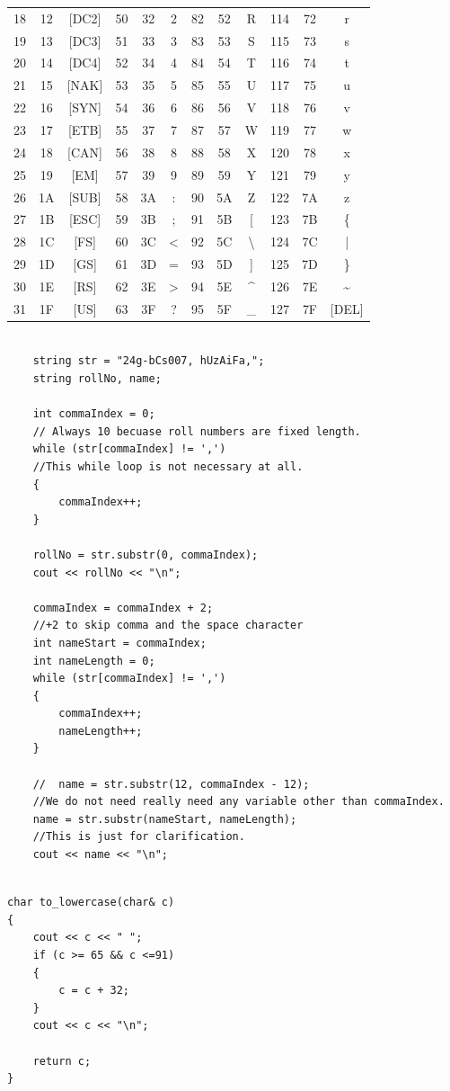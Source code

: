 \documentclass[12pt]{article}
\begin{document}
\begin{table}[H]
{\begin{tabular}{| c | c | c | c | c | c | c | c | c | c | c | c |}
    18 & 12 & [DC2] & 50 & 32 & 2 & 82 & 52 & R & 114 & 72 & r \\
    19 & 13 & [DC3] & 51 & 33 & 3 & 83 & 53 & S & 115 & 73 & s \\
    20 & 14 & [DC4] & 52 & 34 & 4 & 84 & 54 & T & 116 & 74 & t \\
    21 & 15 & [NAK] & 53 & 35 & 5 & 85 & 55 & U & 117 & 75 & u \\
    22 & 16 & [SYN] & 54 & 36 & 6 & 86 & 56 & V & 118 & 76 & v \\
    23 & 17 & [ETB] & 55 & 37 & 7 & 87 & 57 & W & 119 & 77 & w \\
    24 & 18 & [CAN] & 56 & 38 & 8 & 88 & 58 & X & 120 & 78 & x \\
    25 & 19 & [EM] & 57 & 39 & 9 & 89 & 59 & Y & 121 & 79 & y \\
    26 & 1A & [SUB] & 58 & 3A & : & 90 & 5A & Z & 122 & 7A & z \\
    27 & 1B & [ESC] & 59 & 3B & ; & 91 & 5B & [ & 123 & 7B & \{ \\
    28 & 1C & [FS] & 60 & 3C & < & 92 & 5C & \textbackslash & 124 & 7C & | \\
    29 & 1D & [GS] & 61 & 3D & = & 93 & 5D & ] & 125 & 7D & \} \\
    30 & 1E & [RS] & 62 & 3E & > & 94 & 5E & \textasciicircum & 126 & 7E & \textasciitilde \\
    31 & 1F & [US] & 63 & 3F & ? & 95 & 5F & \_ & 127 & 7F & [DEL] \\
    \hline
    \end{tabular}
}
\end{table}





\newpage
\begin{verbatim}

    string str = "24g-bCs007, hUzAiFa,";
    string rollNo, name;

    int commaIndex = 0; 			
    // Always 10 becuase roll numbers are fixed length.
    while (str[commaIndex] != ',')	
    //This while loop is not necessary at all.
    {
        commaIndex++;
    }

    rollNo = str.substr(0, commaIndex);
    cout << rollNo << "\n";

    commaIndex = commaIndex + 2;	
    //+2 to skip comma and the space character
    int nameStart = commaIndex;
    int nameLength = 0;
    while (str[commaIndex] != ',')
    {
        commaIndex++;
        nameLength++;
    }

    //	name = str.substr(12, commaIndex - 12);		
    //We do not need really need any variable other than commaIndex.
    name = str.substr(nameStart, nameLength);	
    //This is just for clarification.
    cout << name << "\n";

\end{verbatim}

\newpage
\begin{verbatim}

char to_lowercase(char& c)
{
    cout << c << " ";
    if (c >= 65 && c <=91)
    {
        c = c + 32;
    }
    cout << c << "\n";

    return c;
}

\end{verbatim}
\end{document}
